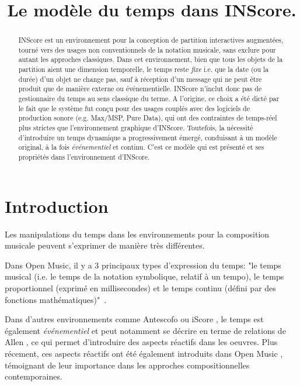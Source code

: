 \documentclass{article}
\title{Le modèle du temps dans INScore.}
\begin{document}
%
\maketitle
%
\begin{abstract}
INScore est un environnement pour la conception de partition interactives augmentées, tourné vers des usages non conventionnels de la notation musicale, sans exclure pour autant les approches classiques. Dans cet environnement, bien que tous les objets de la partition aient une dimension temporelle, le temps reste \emph{fixe} i.e. que la date (ou la durée) d'un objet ne change pas, sauf à réception d'un message qui ne peut être produit que de manière externe ou événementielle. INScore n'inclut donc pas de gestionnaire du temps au sens classique du terme. 
A l'origine, ce choix a été dicté par le fait que le système fut conçu pour des usages couplés avec des logiciels de production sonore (e.g. Max/MSP, Pure Data), qui ont des contraintes de temps-réel plus strictes que l'environnement graphique d'INScore.
Toutefois, la nécessité d'introduire un temps dynamique a progressivement émergé, conduisant à un modèle original, à la fois \emph{événementiel} et continu. C'est ce modèle qui est présenté et ses propriétés dans l'environnement d'INScore.
\end{abstract}

\section{Introduction}\label{sec:introduction}

Les manipulations du temps dans les environnements pour la composition musicale peuvent s'exprimer de manière très différentes.

Dans Open Music, il y a 3 principaux types d'expression du temps: "le temps musical (i.e. le temps de la notation symbolique, relatif à un tempo), le temps proportionnel (exprimé en millisecondes) et le temps continu (défini par des fonctions mathématiques)"~\cite{bresson08}. 

Dans d'autres environnements comme Antescofo \cite{acont08} ou iScore \cite{AllombertDA08}, le temps est également \textit{événementiel} et peut notamment se décrire en terme de relations de Allen \cite{Allen:1983:MKT:182.358434}, ce qui permet d'introduire des aspects réactifs dans les oeuvres. 
Plus récement, ces aspects réactifs ont été également introduits dans Open Music \cite{bresson:hal-00965747}, témoignant de leur importance dans les approches compositionnelles contemporaines.
\end{document}
